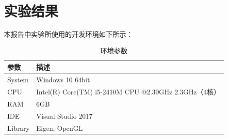 \documentclass[10pt]{article}
\begin{document}
\section{实验结果}
本报告中实验所使用的开发环境如下所示：
\begin{table}[H]
\caption{环境参数}
\begin{center}
\begin{tabular}{ll}
\toprule  %
参数& 描述\\
\midrule  %
System& Windows 10 64bit \\
CPU& Intel(R) Core(TM) i5-2410M CPU @2.30GHz 2.3GHz（4核）\\
RAM& 6GB\\
IDE& Visual Studio 2017 \\
Library& Eigen, OpenGL\\
\bottomrule %
\end{tabular}
\end{center}
\end{table}
\end{document}
